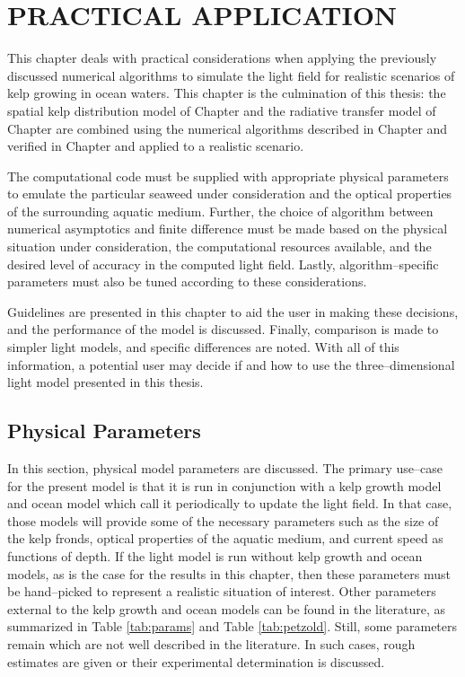 \chapter{PRACTICAL APPLICATION}
\label{chap:application}

This chapter deals with practical considerations when applying the previously discussed numerical algorithms to simulate the light field for realistic scenarios of kelp growing in ocean waters.
This chapter is the culmination of this thesis: the spatial kelp distribution model of Chapter \Rom{\ref{chap:kelp}} and the radiative transfer model of Chapter \Rom{\ref{chap:light}} are combined using the numerical algorithms described in Chapter \Rom{\ref{chap:numerical}} and verified in Chapter \Rom{\ref{chap:model_analysis}} and applied to a realistic scenario.

The computational code must be supplied with appropriate physical parameters to emulate the particular seaweed under consideration and the optical properties of the surrounding aquatic medium.
Further, the choice of algorithm between numerical asymptotics and finite difference must be made based on the physical situation under consideration, the computational resources available, and the desired level of accuracy in the computed light field.
Lastly, algorithm--specific parameters must also be tuned according to these considerations.

Guidelines are presented in this chapter to aid the user in making these decisions, and the performance of the model is discussed.
Finally, comparison is made to simpler light models, and specific differences are noted.
With all of this information, a potential user may decide if and how to use the three--dimensional light model presented in this thesis.

\section{Physical Parameters}
\label{sec:parameters}
In this section, physical model parameters are discussed.
The primary use--case for the present model is that it is run in conjunction with a kelp growth model and ocean model
which call it periodically to update the light field.
In that case, those models will provide some of the necessary parameters such as the size of the kelp fronds, optical properties of the aquatic medium, and current speed as functions of depth.
If the light model is run without kelp growth and ocean models, as is the case for the results in this chapter, then these parameters must be hand--picked to represent a realistic situation of interest.
Other parameters external to the kelp growth and ocean models can be found in the literature,
as summarized in Table \ref{tab:params} and Table \ref{tab:petzold}.
Still, some parameters remain which are not well described in the literature.
In such cases, rough estimates are given or their experimental determination is discussed.

